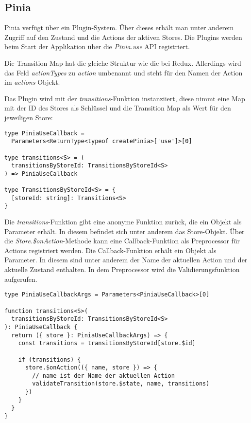 \subsection{Pinia}

Pinia verfügt über ein Plugin-System. Über dieses erhält man unter anderem Zugriff auf den Zustand und die Actions der aktiven Stores. Die Plugins werden beim Start der Applikation über die \textit{Pinia.use} API registriert.

Die Transition Map hat die gleiche Struktur wie die bei Redux. Allerdings wird das Feld \textit{actionTypes} zu \textit{action} umbenannt und steht für den Namen der Action im \textit{actions}-Objekt.

Das Plugin wird mit der \textit{transitions}-Funktion instanziiert, diese nimmt eine Map mit der ID des Stores als Schlüssel und die Transition Map als Wert für den jeweiligen Store:

\begin{lstlisting}
type PiniaUseCallback =
  Parameters<ReturnType<typeof createPinia>['use']>[0]

type transitions<S> = (
  transitionsByStoreId: TransitionsByStoreId<S>
) => PiniaUseCallback

type TransitionsByStoreId<S> = {
  [storeId: string]: Transitions<S>
}
\end{lstlisting}

Die \textit{transitions}-Funktion gibt eine anonyme Funktion zurück, die ein Objekt als Parameter erhält. In diesem befindet sich unter anderem das Store-Objekt. Über die \textit{Store.\$onAction}-Methode kann eine Callback-Funktion als Preprocessor für Actions registriert werden. Die Callback-Funktion erhält ein Objekt als Parameter. In diesem sind unter anderem der Name der aktuellen Action und der aktuelle Zustand enthalten. In dem Preprocessor wird die Validierungsfunktion aufgerufen.

\begin{lstlisting}  
type PiniaUseCallbackArgs = Parameters<PiniaUseCallback>[0]

function transitions<S>(
  transitionsByStoreId: TransitionsByStoreId<S>
): PiniaUseCallback {
  return ({ store }: PiniaUseCallbackArgs) => {
    const transitions = transitionsByStoreId[store.$id]
  
    if (transitions) {
      store.$onAction(({ name, store }) => {
        // name ist der Name der aktuellen Action
        validateTransition(store.$state, name, transitions)
      })
    }
  }
}  
\end{lstlisting}

